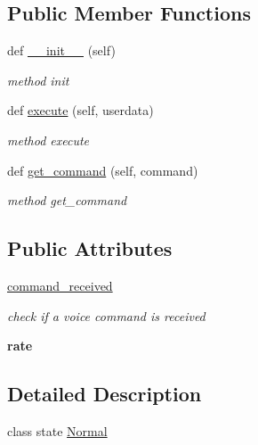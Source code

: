 \subsection*{Public Member Functions}
\begin{DoxyCompactItemize}
\item 
def \hyperlink{classbehaviour__controller_1_1Normal_a4ab0fac79d6253442382a49e4388daf5}{\+\_\+\+\_\+init\+\_\+\+\_\+} (self)
\begin{DoxyCompactList}\small\item\em method init \end{DoxyCompactList}\item 
def \hyperlink{classbehaviour__controller_1_1Normal_a92056bce8fb8c056227de8134c0b2360}{execute} (self, userdata)
\begin{DoxyCompactList}\small\item\em method execute \end{DoxyCompactList}\item 
def \hyperlink{classbehaviour__controller_1_1Normal_afc29036dc946ac6c711417da07ca8690}{get\+\_\+command} (self, command)
\begin{DoxyCompactList}\small\item\em method get\+\_\+command \end{DoxyCompactList}\end{DoxyCompactItemize}
\subsection*{Public Attributes}
\begin{DoxyCompactItemize}
\item 
\hyperlink{classbehaviour__controller_1_1Normal_a52be6081cfd23a5661fb4304774f1d17}{command\+\_\+received}
\begin{DoxyCompactList}\small\item\em check if a voice command is received \end{DoxyCompactList}\item 
\mbox{\label{classbehaviour__controller_1_1Normal_ac9e8f54b79853ae9dcb0c5b4473aaab5}} 
{\bfseries rate}
\end{DoxyCompactItemize}


\subsection{Detailed Description}
class state \hyperlink{classbehaviour__controller_1_1Normal}{Normal} 


